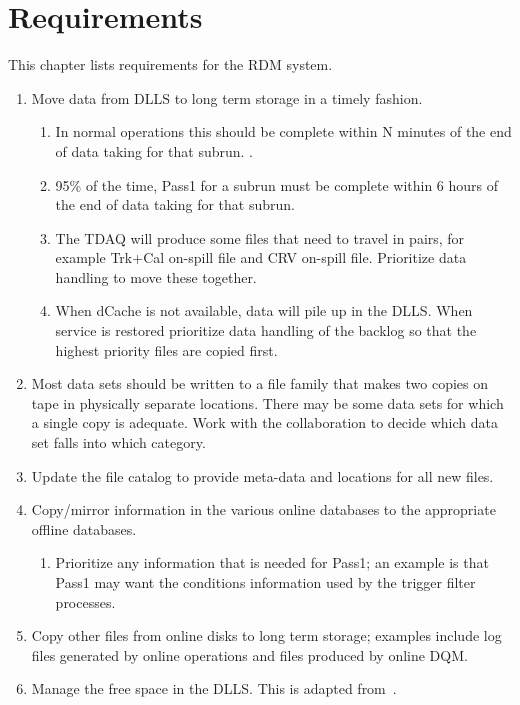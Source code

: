 \chapter{Requirements}
\label{ch:requirements}

This chapter lists requirements for the RDM system.

\begin{enumerate}
\item Move data from DLLS to long term storage in a timely fashion.
  \begin{enumerate}
  \item In normal operations this should be complete within N minutes of the end of data taking for that subrun. .
  \item 95\% of the time, Pass1 for a subrun must be complete within 6 hours of the end of data taking for that subrun.
  \item The TDAQ will produce some files that need to travel in pairs, for example Trk+Cal on-spill file and CRV on-spill file.
    Prioritize data handling to move these together.
  \item When dCache is not available, data will pile up in the DLLS.  When service is restored prioritize data handling of the backlog
    so that the highest priority files are copied first.
  \end{enumerate}
\item Most data sets should be written to a file family that makes two copies on tape in physically separate locations.
  There may be some data sets for which a single copy is adequate.
  Work with the collaboration to decide which data set falls into which category.
\item Update the file catalog to provide meta-data and locations for all new files.
\item Copy/mirror information in the various online databases to the appropriate offline databases.
  \begin{enumerate}
  \item Prioritize any information that is needed for Pass1; an example is that Pass1 may want the conditions information
    used by the trigger filter processes.
  \end{enumerate}
\item Copy other files from online disks to long term storage; examples include log files generated by online
  operations and files produced by online DQM.
\item Manage the free space in the DLLS.  This is adapted from~\cite{OnlineMonitoring}.

\end{enumerate}
